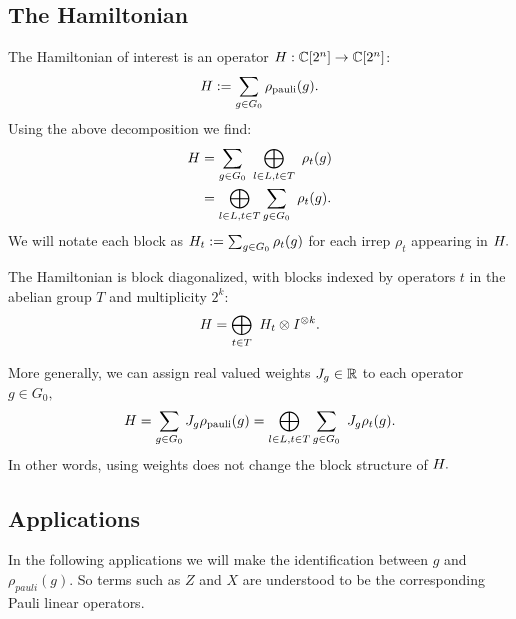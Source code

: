 \documentclass[12pt]{article}
\renewenvironment{framed}[1][\hsize]{%
\def\FrameCommand{{\color{black}\vrule width 3pt}\hspace{0pt}\fboxsep=\FrameSep\colorbox{lightgray}}%
\MakeFramed{\hsize0.8\linewidth\advance\hsize-\width\FrameRestore}}
{\endMakeFramed}
\begin{document}
\subsection{The Hamiltonian}

The Hamiltonian of interest is 
an operator $H:\mathbb{C}[2^n]\to\mathbb{C}[2^n]$:
$$ H := \sum_{g\in G_0} \rho_{\mathrm{pauli}}(g).$$
Using the above decomposition we find:
\begin{align*}
    H &= \sum_{g\in G_0}\ \bigoplus_{l\in L, t\in T}\ \rho_t(g)\\
         &= \bigoplus_{l\in L, t\in T} \sum_{g\in G_0}\ \rho_t(g).
\end{align*}
We will notate each block as
$H_t := \sum_{g\in G_0}\rho_t(g)$
for each irrep $\rho_t$ appearing in $H.$
\begin{framed}

The Hamiltonian is block diagonalized, with blocks indexed by operators $t$ in
the abelian group $T$ and multiplicity $2^k:$
$$
    H =  \bigoplus_{t\in T}\ H_t \otimes I^{\otimes k}.
$$
\end{framed}

More generally, we can assign real valued weights
$J_g\in\mathbb{R}$
to each operator $g\in G_0,$
\begin{align*}
    H = \sum_{g\in G_0} J_g \rho_{\mathrm{pauli}}(g)
            = \bigoplus_{l\in L, t\in T} \sum_{g\in G_0}\ J_g \rho_t(g).
\end{align*}
In other words, using weights does not change the block structure of $H.$

%
%

\subsection{Applications}

In the following applications we will make the identification
between $g$ and $\rho_{pauli}(g)$.
So terms such as $Z$ and $X$ are understood
to be the corresponding Pauli linear operators.
\end{document}
